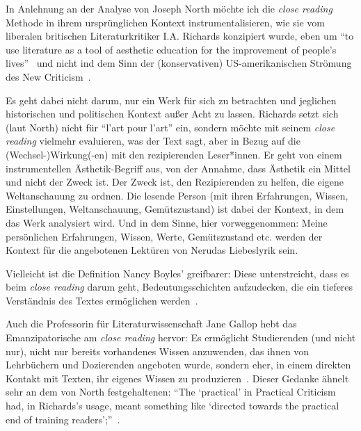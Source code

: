 In Anlehnung an der Analyse von Joseph North möchte ich die \textit{close reading} Methode in ihrem ursprünglichen Kontext instrumentalisieren, wie sie vom liberalen britischen Literaturkritiker I.A. Richards konzipiert wurde, eben um ``to use literature as a tool of aesthetic education for the improvement of people's lives''~\cite{North2013}
und nicht ind dem Sinn der (konservativen) US-amerikanischen Strömung des New Criticism~\cite{North2013}.

Es geht dabei nicht darum, nur ein Werk für sich zu betrachten und jeglichen historischen und politischen Kontext außer Acht zu lassen.
Richards setzt sich (laut North) nicht für ``l'art pour l'art'' ein, sondern möchte mit seinem \textit{close reading} vielmehr evaluieren, was der Text sagt, aber in Bezug auf die (Wechsel-)Wirkung(-en) mit den rezipierenden Leser*innen.
Er geht von einem instrumentellen Ästhetik-Begriff aus, von der Annahme, dass Ästhetik ein Mittel und nicht der Zweck ist.
Der Zweck ist, den Rezipierenden zu helfen, die eigene Weltanschauung zu ordnen.
Die lesende Person (mit ihren Erfahrungen, Wissen, Einstellungen, Weltanschauung, Gemütszustand) ist dabei der Kontext, in dem das Werk analysiert wird.
Und in dem Sinne, hier vorweggenommen:
Meine persönlichen Erfahrungen, Wissen, Werte, Gemütszustand etc. werden der Kontext für die angebotenen Lektüren von Nerudas Liebeslyrik sein.

Vielleicht ist die Definition Nancy Boyles' greifbarer: 
Diese unterstreicht, dass es beim \textit{close reading} darum geht, Bedeutungsschichten aufzudecken, die ein tieferes Verständnis des Textes ermöglichen werden~\cite[S. 90]{Boyles2016}.

Auch die Professorin für Literaturwissenschaft Jane Gallop hebt das Emanzipatorische am \textit{close reading} hervor:
Es ermöglicht Studierenden (und nicht nur), nicht nur bereits vorhandenes Wissen anzuwenden, das ihnen von Lehrbüchern und Dozierenden angeboten wurde, sondern eher, in einem direkten Kontakt mit Texten, ihr eigenes Wissen zu produzieren~\cite{Gallop2007}.
Dieser Gedanke ähnelt sehr an dem von North festgehaltenen: ``The `practical' in Practical Criticism had, in Richards’s usage, meant something like `directed towards the practical end of training readers';''~\cite{North2013}.


